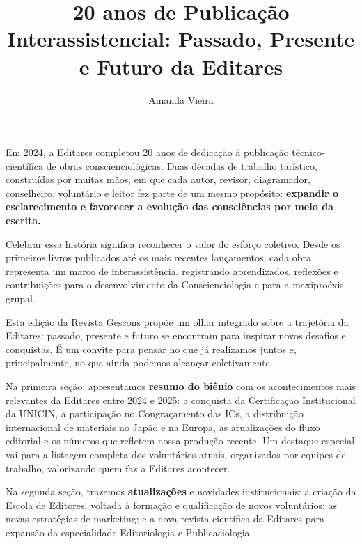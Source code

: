 \documentclass{gescons}
\author{Amanda Vieira}
\title{20 anos de Publicação Interassistencial: Passado, Presente e Futuro da Editares}
\begin{document}
    \makeentrevistatitle



    \begin{multicols}{2}


Em 2024, a Editares completou 20 anos de dedicação à publicação técnico-científica de obras conscienciológicas. Duas décadas de trabalho tarístico, construídas por muitas mãos, em que cada autor, revisor, diagramador, conselheiro, voluntário e leitor fez parte de um mesmo propósito: \textbf{expandir o esclarecimento e favorecer a evolução das consciências por meio da escrita.}

Celebrar essa história significa reconhecer o valor do esforço coletivo. Desde os primeiros livros publicados até os mais recentes lançamentos, cada obra representa um marco de interassistência, registrando aprendizados, reflexões e contribuições para o desenvolvimento da Conscienciologia e para a maxiproéxis grupal.

Esta edição da Revista Gescons propõe um olhar integrado sobre a trajetória da Editares: passado, presente e futuro se encontram para inspirar novos desafios e conquistas. É um convite para pensar no que já realizamos juntos e, principalmente, no que ainda podemos alcançar coletivamente.

Na primeira seção, apresentamos \textbf{resumo do biênio} com os acontecimentos mais relevantes da Editares entre 2024 e 2025: a conquista da Certificação Institucional da UNICIN, a participação no Congraçamento das ICs, a distribuição internacional de materiais no Japão e na Europa, as atualizações do fluxo editorial e os números que refletem nossa produção recente. Um destaque especial vai para a listagem completa dos voluntários atuais, organizados por equipes de trabalho, valorizando quem faz a Editares acontecer.

Na segunda seção, trazemos \textbf{atualizações} e novidades institucionais: a criação da Escola de Editores, voltada à formação e qualificação de novos voluntários; as novas estratégias de marketing; e a nova revista científica da Editares para expansão da especialidade Editoriologia e Publicaciologia. 


\end{multicols}
\end{document}

